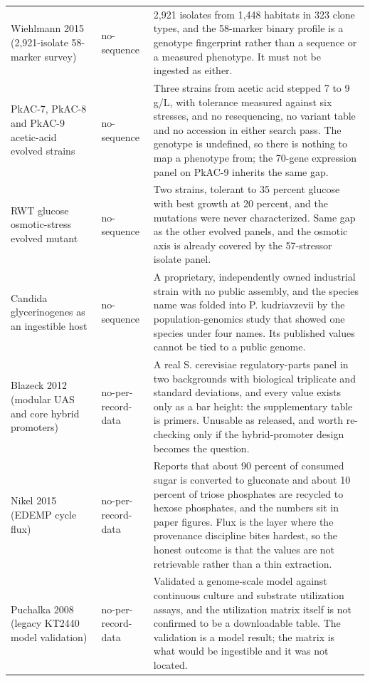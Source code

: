 \begin{longtable}{@{}L{58mm} L{26mm} L{88mm}@{}}
\addlinespace[5pt]
Wiehlmann 2015 (2,921-isolate 58-marker survey) & no-sequence & 2,921 isolates from 1,448 habitats in 323 clone types, and the 58-marker binary profile is a genotype fingerprint rather than a sequence or a measured phenotype. It must not be ingested as either. \\
\addlinespace[5pt]
PkAC-7, PkAC-8 and PkAC-9 acetic-acid evolved strains & no-sequence & Three strains from acetic acid stepped 7 to 9 g/L, with tolerance measured against six stresses, and no resequencing, no variant table and no accession in either search pass. The genotype is undefined, so there is nothing to map a phenotype from; the 70-gene expression panel on PkAC-9 inherits the same gap. \\
\addlinespace[5pt]
RWT glucose osmotic-stress evolved mutant & no-sequence & Two strains, tolerant to 35 percent glucose with best growth at 20 percent, and the mutations were never characterized. Same gap as the other evolved panels, and the osmotic axis is already covered by the 57-stressor isolate panel. \\
\addlinespace[5pt]
Candida glycerinogenes as an ingestible host & no-sequence & A proprietary, independently owned industrial strain with no public assembly, and the species name was folded into P. kudriavzevii by the population-genomics study that showed one species under four names. Its published values cannot be tied to a public genome. \\
\addlinespace[5pt]
Blazeck 2012 (modular UAS and core hybrid promoters) & no-per-record-data & A real S. cerevisiae regulatory-parts panel in two backgrounds with biological triplicate and standard deviations, and every value exists only as a bar height: the supplementary table is primers. Unusable as released, and worth re-checking only if the hybrid-promoter design becomes the question. \\
\addlinespace[5pt]
Nikel 2015 (EDEMP cycle flux) & no-per-record-data & Reports that about 90 percent of consumed sugar is converted to gluconate and about 10 percent of triose phosphates are recycled to hexose phosphates, and the numbers sit in paper figures. Flux is the layer where the provenance discipline bites hardest, so the honest outcome is that the values are not retrievable rather than a thin extraction. \\
\addlinespace[5pt]
Puchalka 2008 (legacy KT2440 model validation) & no-per-record-data & Validated a genome-scale model against continuous culture and substrate utilization assays, and the utilization matrix itself is not confirmed to be a downloadable table. The validation is a model result; the matrix is what would be ingestible and it was not located. \\

\end{longtable}
